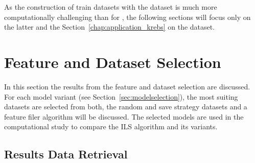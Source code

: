 \parbreak

As the construction of train datasets with the \krebsADataSetText dataset is much more computationally challenging than for \gendreauDataSet,
the following sections will focus only on the latter and the Section~\ref{chap:application_krebs} on the \krebsADataSetText dataset.

\section{Feature and Dataset Selection}
\label{sec:ResultsTraining}
In this section the results from the feature and dataset selection are discussed. For each model variant (see Section~\ref{sec:modelselection}),
the most suiting datasets are selected from both, the random and save strategy datasets and
a feature filer algorithm will be discussed. The selected models are used in the computational study to compare the \gls{ILS} algorithm
and its variants.

\subsection{Results Data Retrieval}
\label{subsec:results_retrieval}

